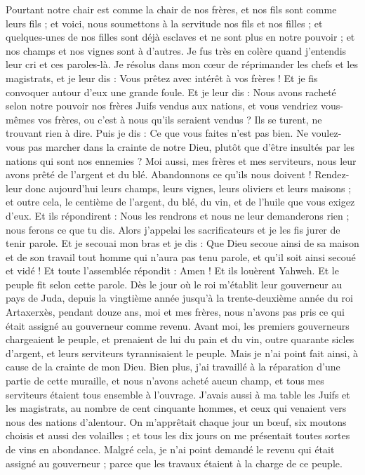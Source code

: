 \begin{multicols}{2}
Pourtant notre chair est comme la chair de nos frères, et nos fils sont comme leurs fils ; et voici, nous soumettons à la servitude nos fils et nos filles ; et quelques-unes de nos filles sont déjà esclaves et ne sont plus en notre pouvoir ; et nos champs et nos vignes sont à d'autres.
Je fus très en colère quand j'entendis leur cri et ces paroles-là.
Je résolus dans mon cœur de réprimander les chefs et les magistrats, et je leur dis : Vous prêtez avec intérêt à vos frères ! Et je fis convoquer autour d’eux une grande foule.
Et je leur dis : Nous avons racheté selon notre pouvoir nos frères Juifs vendus aux nations, et vous vendriez vous-mêmes vos frères, ou c'est à nous qu'ils seraient vendus ? Ils se turent, ne trouvant rien à dire.
Puis je dis : Ce que vous faites n’est pas bien. Ne voulez-vous pas marcher dans la crainte de notre Dieu, plutôt que d'être insultés par les nations qui sont nos ennemies ?
Moi aussi, mes frères et mes serviteurs, nous leur avons prêté de l'argent et du blé. Abandonnons ce qu'ils nous doivent !
Rendez-leur donc aujourd'hui leurs champs, leurs vignes, leurs oliviers et leurs maisons ; et outre cela, le centième de l'argent, du blé, du vin, et de l'huile que vous exigez d'eux.
Et ils répondirent : Nous les rendrons et nous ne leur demanderons rien ; nous ferons ce que tu dis. Alors j'appelai les sacrificateurs et je les fis jurer de tenir parole.
Et je secouai mon bras et je dis : Que Dieu secoue ainsi de sa maison et de son travail tout homme qui n'aura pas tenu parole, et qu'il soit ainsi secoué et vidé ! Et toute l'assemblée répondit : Amen ! Et ils louèrent Yahweh. Et le peuple fit selon cette parole.
Dès le jour où le roi m'établit leur gouverneur au pays de Juda, depuis la vingtième année jusqu'à la trente-deuxième année du roi Artaxerxès, pendant douze ans, moi et mes frères, nous n'avons pas pris ce qui était assigné au gouverneur comme revenu.
Avant moi, les premiers gouverneurs chargeaient le peuple, et prenaient de lui du pain et du vin, outre quarante sicles d'argent, et leurs serviteurs tyrannisaient le peuple. Mais je n'ai point fait ainsi, à cause de la crainte de mon Dieu.
Bien plus, j'ai travaillé à la réparation d’une partie de cette muraille, et nous n'avons acheté aucun champ, et tous mes serviteurs étaient tous ensemble à l'ouvrage.
J'avais aussi à ma table les Juifs et les magistrats, au nombre de cent cinquante hommes, et ceux qui venaient vers nous des nations d’alentour.
On m’apprêtait chaque jour un bœuf, six moutons choisis et aussi des volailles ; et tous les dix jours on me présentait toutes sortes de vins en abondance. Malgré cela, je n'ai point demandé le revenu qui était assigné au gouverneur ; parce que les travaux étaient à la charge de ce peuple.

\end{multicols}
